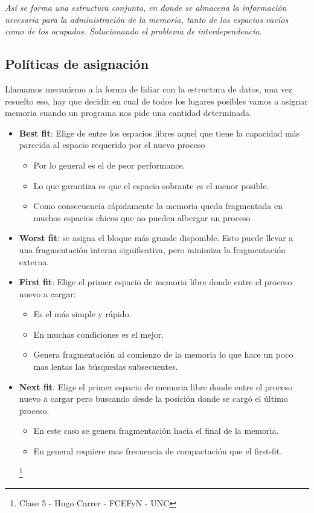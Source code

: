 \documentclass{article}
\begin{document}
\textit{Así se forma una estructura conjunta, en donde se almacena la información necesaria para la administración de la memoria, tanto de los espacios vacíos como de los ocupados. Solucionando el problema de interdependencia.}

\subsection{Políticas de asignación}
Llamamos mecanismo a la forma de lidiar con la estructura de datos, una vez resuelto eso, hay que decidir en cual de todos los lugares posibles vamos a asignar memoria cuando un programa nos pide una cantidad determinada.

\begin{itemize}
    \item \textbf{Best fit}: Elige de entre los espacios libres aquel que tiene la capacidad más parecida al espacio requerido por el nuevo proceso
        \begin{itemize}
            \item Por lo general es el de peor performance.
            \item Lo que garantiza es que el espacio sobrante es el menor posible.
            \item Como consecuencia rápidamente la memoria queda fragmentada en muchos espacios chicos que no pueden albergar un proceso
        \end{itemize}
    \item \textbf{Worst fit}: se asigna el bloque más grande disponible. Esto puede llevar a una fragmentación interna significativa, pero minimiza la fragmentación externa.
    \item \textbf{First fit}: Elige el primer espacio de memoria libre donde entre el proceso nuevo a cargar:
    \begin{itemize}
        \item Es el más simple y rápido.
        \item En muchas condiciones es el mejor.
        \item Genera fragmentación al comienzo de la memoria lo que hace un poco mas lentas las búsquedas subsecuentes.
    \end{itemize}
    \item \textbf{Next fit}: Elige el primer espacio de memoria libre donde entre el proceso nuevo a cargar pero buscando desde la posición donde se cargó el último proceso.
    \begin{itemize}
        \item En este caso se genera fragmentación hacia el final de la memoria.
        \item En general requiere mas frecuencia de compactación que el first-fit.  
    \end{itemize} \footnote{Clase 5 - Hugo Carrer - FCEFyN - UNC}
\end{itemize}
\end{document}

